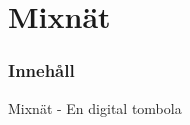 \section{Mixnät}
\begin{frame}
\frametitle{Innehåll}
\tableofcontents[currentsection]
\end{frame}

\begin{frame}{Mixnät - En digital tombola}

\begin{center}
\end{center}


\end{frame}